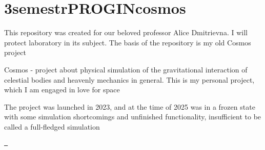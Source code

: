 \chapter{3semestr\+PROGINcosmos}
\hypertarget{md__r_e_a_d_m_e}{}\label{md__r_e_a_d_m_e}
\label{md__r_e_a_d_m_e_autotoc_md0}%
%


This repository was created for our beloved professor Alice Dmitrievna. I will protect laboratory in its subject. The basis of the repository is my old Cosmos project

Cosmos -\/ project about physical simulation of the gravitational interaction of celestial bodies and heavenly mechanics in general. This is my personal project, which I am engaged in love for space

The project was launched in 2023, and at the time of 2025 was in a frozen state with some simulation shortcomings and unfinished functionality, insufficient to be called a full-\/fledged simulation

\href{https://github.com/kirbornu/3semestrPROGINcosmos/actions/workflows/build.yaml}{\texttt{ }} 